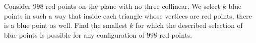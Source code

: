 Consider $998$ red points on the plane with no three collinear. We select $k$ blue points in such a way that inside each triangle whose vertices are red points, there is a blue point as well. Find the smallest $k$ for which the described selection of blue points is possible for any configuration of $998$ red points.